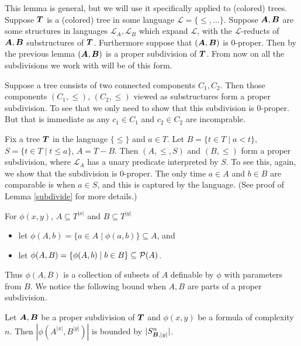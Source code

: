 \documentclass{amsart}
\DeclareMathOperator{\TT}{\boldface T}
\DeclareMathOperator{\A}{\boldface A}
\DeclareMathOperator{\B}{\boldface B}
\renewcommand{\LL}{\mathcal L}
\begin{document}
This lemma is general, but we will use it specifically applied to (colored) trees.
Suppose $\TT$ is a (colored) tree in some language $\LL = \{\leq, \ldots\}$.
Suppose $\A, \B$ are some structures in languages $\LL_A, \LL_B$ which expand $\LL$, with the $\LL$-reducts of $\A, \B$ substructures of $\TT$.
Furthermore suppose that $(\A, \B)$ is 0-proper.
Then by the previous lemma $(\A, \B)$ is a proper subdivision of $\TT$.
From now on all the subdivisions we work with will be of this form.

\begin{Example} \label{ex_disc}
  Suppose a tree consists of two connected components $C_1, C_2$.
  Then those components $(C_1, \leq)$, $(C_2, \leq)$ viewed as substructures form a proper subdivision.
  To see that we only need to show that this subdivision is 0-proper.
  But that is immediate as any $c_1 \in C_1$ and $c_2 \in C_2$ are incomprable.
\end{Example}

\begin{Example} \label{ex_cone}
  Fix a tree $\TT$ in the language $\{\leq\}$ and $a \in T$. Let $B = \{t \in T \mid a < t\}$, $S = \{t \in T \mid t \leq a\}$, $A = T - B$. Then $(A, \leq, S)$ and $(B, \leq)$ form a proper subdivision, where $\LL_A$ has a unary predicate interpreted by $S$.
  To see this, again, we show that the subdivision is 0-proper.
  The only time $a \in A$ and $b \in B$ are comparable is when $a \in S$, and this is captured by the language.
  (See proof of Lemma \ref{subdivide} for more details.)
\end{Example}

\begin{Definition} For $\phi(x, y)$, $A \subseteq T^{|x|}$ and $B \subseteq T^{|y|}$
  \begin{itemize}
  \item let $\phi(A, b) = \{a \in A \mid \phi(a, b)\} \subseteq A$, and 
  \item let $\phi(A, B) = \{\phi(A, b) \mid b \in B\} \subseteq \mathcal P(A)$.	
  \end{itemize}
\end{Definition}
Thus $\phi(A, B)$ is a collection of subsets of $A$ definable by $\phi$ with parameters from $B$. We notice the following bound when $A, B$ are parts of a proper subdivision.

\begin{Corollary} \label{cor_type_count}
  Let $\A, \B$ be a proper subdivision of $\TT$ and $\phi(x,y)$ be a formula of complexity $n$. Then $|\phi(A^{|x|}, B^{|y|})|$ is bounded by $|S^n_{\B, |y|}|$.
\end{Corollary}
\end{document}
